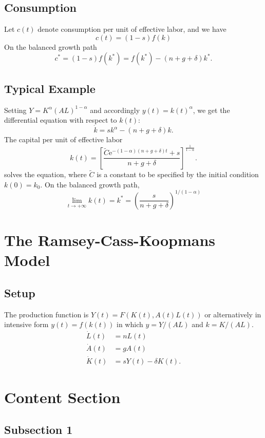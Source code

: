 \documentclass[12pt]{article} %
\newcommand{\e}{\mathrm{e}}
\begin{document}
\subsection{Consumption}
Let $c(t)$ denote consumption per unit of effective labor, and we have
\[
c(t)=(1-s)f(k)
\]
On the balanced growth path
\[
c^*=(1-s)f(k^*)=f(k^*)-(n+g+\delta)k^*.
\] 
\subsection{Typical Example}

Setting $Y=K^\alpha (AL)^{1-\alpha}$ and accordingly $y(t)=k(t)^\alpha$, we get the differential equation with respect to $k(t)$:
\[
\dot{k}=sk^\alpha-(n+g+\delta)k.
\]
The capital per unit of effective labor 
\[
k(t)=\left[\dfrac{\widetilde{C}\e^{-(1-\alpha)(n+g+\delta)t}+s}{n+g+\delta}\right]^{\tfrac{1}{1-\alpha}}.
\]
solves the equation, where $\widetilde{C}$ is a constant to be specified by the initial condition $k(0)=k_0$. On the balanced growth path, 
\[
\lim\limits_{t\rightarrow+\infty}k(t)=k^*=\left(\dfrac{s}{n+g+\delta}\right)^{1/(1-\alpha)}
\]



\newpage


\section{The Ramsey-Cass-Koopmans Model} 
\subsection{Setup} %
The production function is $Y(t)=F(K(t),A(t)L(t))$ or alternatively in intensive form $y(t)=f(k(t))$ in which $y=Y/(AL)$ and $k=K/(AL)$.
\begin{align*}
\dot{L}(t) & =nL(t) \\
\dot{A}(t) & =gA(t) \\
\dot{K}(t) & =sY(t)-\delta K(t).
\end{align*}
\section{Content Section} %

\lipsum[5] %


\subsection{Subsection 1} %
\end{document}
